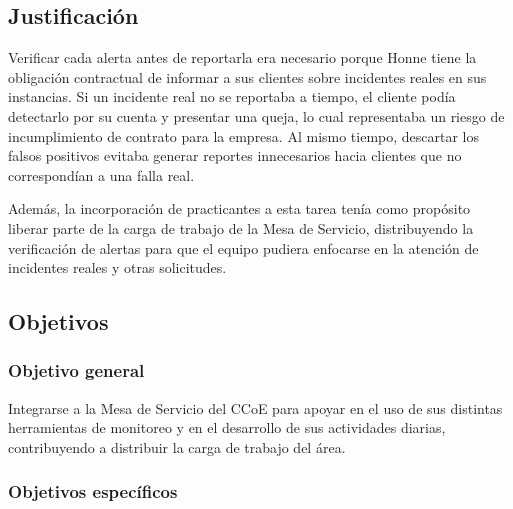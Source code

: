 \subsection{Justificación}
\label{sec:justificacion}

Verificar cada alerta antes de reportarla era necesario porque Honne tiene la obligación contractual de informar a sus clientes sobre incidentes reales en sus instancias. Si un incidente real no se reportaba a tiempo, el cliente podía detectarlo por su cuenta y presentar una queja, lo cual representaba un riesgo de incumplimiento de contrato para la empresa. Al mismo tiempo, descartar los falsos positivos evitaba generar reportes innecesarios hacia clientes que no correspondían a una falla real.

Además, la incorporación de practicantes a esta tarea tenía como propósito liberar parte de la carga de trabajo de la Mesa de Servicio, distribuyendo la verificación de alertas para que el equipo pudiera enfocarse en la atención de incidentes reales y otras solicitudes.

\subsection{Objetivos}
\label{sec:objetivos}

\subsubsection{Objetivo general}
\label{subsec:objetivo_general}

Integrarse a la Mesa de Servicio del CCoE para apoyar en el uso de sus distintas herramientas de monitoreo y en el desarrollo de sus actividades diarias, contribuyendo a distribuir la carga de trabajo del área.

\subsubsection{Objetivos específicos}
\label{subsec:objetivos_especificos}

